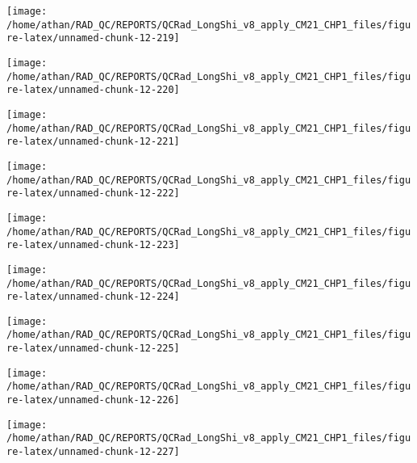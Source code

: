 \documentclass[
  10pt,
  a4paper,oneside]{article}
\begin{document}
\begin{center}\texttt{[image: /home/athan/RAD\_QC/REPORTS/QCRad\_LongShi\_v8\_apply\_CM21\_CHP1\_files/figure-latex/unnamed-chunk-12-219]} \end{center}

\begin{center}\texttt{[image: /home/athan/RAD\_QC/REPORTS/QCRad\_LongShi\_v8\_apply\_CM21\_CHP1\_files/figure-latex/unnamed-chunk-12-220]} \end{center}

\begin{center}\texttt{[image: /home/athan/RAD\_QC/REPORTS/QCRad\_LongShi\_v8\_apply\_CM21\_CHP1\_files/figure-latex/unnamed-chunk-12-221]} \end{center}

\begin{center}\texttt{[image: /home/athan/RAD\_QC/REPORTS/QCRad\_LongShi\_v8\_apply\_CM21\_CHP1\_files/figure-latex/unnamed-chunk-12-222]} \end{center}

\begin{center}\texttt{[image: /home/athan/RAD\_QC/REPORTS/QCRad\_LongShi\_v8\_apply\_CM21\_CHP1\_files/figure-latex/unnamed-chunk-12-223]} \end{center}

\begin{center}\texttt{[image: /home/athan/RAD\_QC/REPORTS/QCRad\_LongShi\_v8\_apply\_CM21\_CHP1\_files/figure-latex/unnamed-chunk-12-224]} \end{center}

\begin{center}\texttt{[image: /home/athan/RAD\_QC/REPORTS/QCRad\_LongShi\_v8\_apply\_CM21\_CHP1\_files/figure-latex/unnamed-chunk-12-225]} \end{center}

\begin{center}\texttt{[image: /home/athan/RAD\_QC/REPORTS/QCRad\_LongShi\_v8\_apply\_CM21\_CHP1\_files/figure-latex/unnamed-chunk-12-226]} \end{center}

\begin{center}\texttt{[image: /home/athan/RAD\_QC/REPORTS/QCRad\_LongShi\_v8\_apply\_CM21\_CHP1\_files/figure-latex/unnamed-chunk-12-227]} \end{center}
\end{document}
